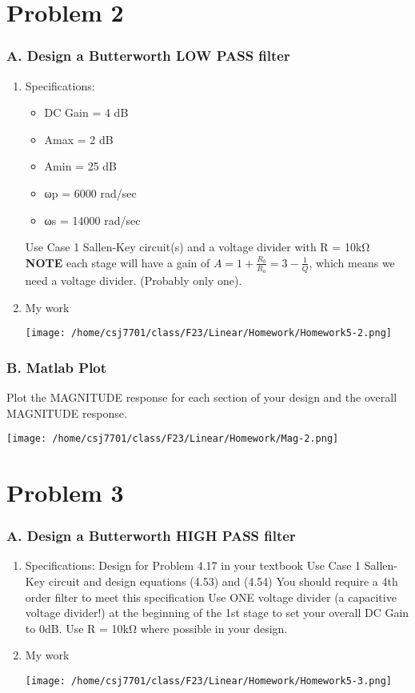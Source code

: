 \documentclass[11pt]{article}
\begin{document}
\section{Problem 2}
\label{sec:orgff93135}
\subsubsection{A. Design a Butterworth LOW PASS filter}
\label{sec:orge388456}
\begin{enumerate}
\item Specifications:
\label{sec:org3eece12}
\begin{itemize}
\item DC Gain = 4 dB
\item Amax = 2 dB
\item Amin = 25 dB
\item ωp = 6000 rad/sec
\item ωs = 14000 rad/sec
\end{itemize}
Use Case 1 Sallen-Key circuit(s) and a voltage divider with R = 10kΩ
\textbf{NOTE} each stage will have a gain of \(A=1+\frac{R_{b}}{R_{a}} = 3-\frac{1}{Q}\), which means we need a voltage divider. (Probably only one).
\item My work
\label{sec:orgdfd716b}
\begin{center}
\texttt{[image: /home/csj7701/class/F23/Linear/Homework/Homework5-2.png]}
\end{center}
\end{enumerate}
\subsubsection{B. Matlab Plot}
\label{sec:orgee79ec4}
Plot the MAGNITUDE response for each section of your design and the overall MAGNITUDE response.
\begin{center}
\texttt{[image: /home/csj7701/class/F23/Linear/Homework/Mag-2.png]}
\end{center}
\section{Problem 3}
\label{sec:org6703505}
\subsubsection{A. Design a Butterworth HIGH PASS filter}
\label{sec:org30b8fe0}
\begin{enumerate}
\item Specifications:
\label{sec:org062f205}
Design for Problem 4.17 in your textbook
Use Case 1 Sallen-Key circuit and design equations (4.53) and (4.54)
You should require a 4th order filter to meet this specification
Use ONE voltage divider (a capacitive voltage divider!) at the beginning of the 1st stage to set your overall DC Gain to 0dB. Use R = 10kΩ where possible in your design.
\item My work
\label{sec:orgc0e2212}
\begin{center}
\texttt{[image: /home/csj7701/class/F23/Linear/Homework/Homework5-3.png]}
\end{center}
\end{enumerate}
\end{document}
